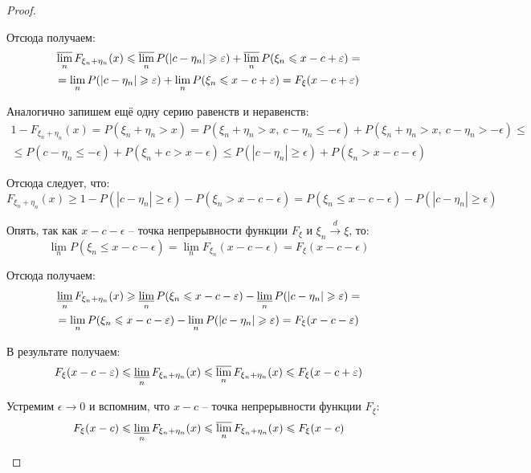 \begin{proof}
\begin{enumerate}
        Отсюда получаем:
        \begin{multline*}
            \varlimsup_n F_{\xi_n + \eta_n}(x) \leqslant \varlimsup_n P(|c - \eta_n| \geqslant \epsilon) + \varlimsup_n P(\xi_n \leqslant x - c + \epsilon) =
            \\
            = \lim_n P(|c - \eta_n| \geqslant \epsilon) + \lim_n P(\xi_n \leqslant x - c + \epsilon) = F_\xi(x - c + \epsilon)
        \end{multline*}

        Аналогично запишем ещё одну серию равенств и неравенств:
        \begin{multline*}
            1 - F_{\xi_n + \eta_n}(x) = P(\xi_n + \eta_n > x) = P(\xi_n + \eta_n > x,\ c - \eta_n \leqslant -\epsilon) + P(\xi_n + \eta_n > x,\ c - \eta_n > -\epsilon) \leqslant
            \\
            \leqslant P(c - \eta_n \leqslant -\epsilon) + P(\xi_n + c > x - \epsilon) \leqslant P(|c - \eta_n| \geqslant \epsilon) + P(\xi_n > x - c - \epsilon)
        \end{multline*}

        Отсюда следует, что:
        \[
            F_{\xi_n + \eta_n}(x) \geqslant 1 - P(|c - \eta_n| \geqslant \epsilon) - P(\xi_n > x - c - \epsilon) = P(\xi_n \leqslant x - c - \epsilon) - P(|c - \eta_n| \geqslant \epsilon)
        \]

        Опять, так как $x-c-\epsilon$ -- точка непрерывности функции $F_\xi$ и $\xi_n \xrightarrow{d} \xi$, то:
        \[
            \lim_n P(\xi_n \leqslant x - c - \epsilon) = \lim_n F_{\xi_n}(x - c - \epsilon) = F_\xi(x - c - \epsilon)
        \]

        Отсюда получаем:
        \begin{multline*}
            \varliminf_n F_{\xi_n + \eta_n}(x) \geqslant \varliminf_n P(\xi_n \leqslant x - c - \epsilon) - \varliminf_n P(|c - \eta_n| \geqslant \epsilon) =
            \\
            = \lim_n P(\xi_n \leqslant x - c - \epsilon) - \lim_n P(|c - \eta_n| \geqslant \epsilon) = F_\xi(x - c - \epsilon)
        \end{multline*}

        В результате получаем:
        \[
            F_\xi(x - c - \epsilon) \leqslant \varliminf_n F_{\xi_n + \eta_n}(x) \leqslant \varlimsup_n F_{\xi_n + \eta_n}(x) \leqslant F_\xi(x - c + \epsilon)
        \]

        Устремим $\epsilon \to 0$ и вспомним, что $x-c$ -- точка непрерывности функции $F_{\xi}$:
        \[
            F_\xi(x - c) \leqslant \varliminf_n F_{\xi_n + \eta_n}(x) \leqslant \varlimsup_n F_{\xi_n + \eta_n}(x) \leqslant F_\xi(x - c)
        \]


\end{enumerate}
\end{proof}
